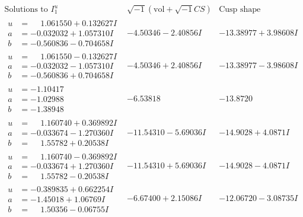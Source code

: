\documentclass[1p]{elsarticle_modified}
\theoremstyle{definition}
\newcommand{\I}{\sqrt{-1}}
\begin{document}
$$\begin{array}{c|c|c}  
\text{Solutions to }I^u_{1}& \I (\text{vol} + \sqrt{-1}CS) & \text{Cusp shape}\\
 \hline 
\begin{aligned}
u &= \phantom{-}1.061550 + 0.132627 I \\
a &= -0.032032 + 1.057310 I \\
b &= -0.560836 - 0.704658 I\end{aligned}
 & -4.50346 - 2.40856 I & -13.38977 + 3.98608 I \\ \hline\begin{aligned}
u &= \phantom{-}1.061550 - 0.132627 I \\
a &= -0.032032 - 1.057310 I \\
b &= -0.560836 + 0.704658 I\end{aligned}
 & -4.50346 + 2.40856 I & -13.38977 - 3.98608 I \\ \hline\begin{aligned}
u &= -1.10417\phantom{ +0.000000I} \\
a &= -1.02988\phantom{ +0.000000I} \\
b &= -1.38948\phantom{ +0.000000I}\end{aligned}
 & -6.53818\phantom{ +0.000000I} & -13.8720\phantom{ +0.000000I} \\ \hline\begin{aligned}
u &= \phantom{-}1.160740 + 0.369892 I \\
a &= -0.033674 - 1.270360 I \\
b &= \phantom{-}1.55782 + 0.20538 I\end{aligned}
 & -11.54310 - 5.69036 I & -14.9028 + 4.0871 I \\ \hline\begin{aligned}
u &= \phantom{-}1.160740 - 0.369892 I \\
a &= -0.033674 + 1.270360 I \\
b &= \phantom{-}1.55782 - 0.20538 I\end{aligned}
 & -11.54310 + 5.69036 I & -14.9028 - 4.0871 I \\ \hline\begin{aligned}
u &= -0.389835 + 0.662254 I \\
a &= -1.45018 + 1.06769 I \\
b &= \phantom{-}1.50356 - 0.06755 I\end{aligned}
 & -6.67400 + 2.15086 I & -12.06720 - 3.08735 I \\ \hline\begin{aligned}

\end{aligned}
\end{array}$$
\end{document}
